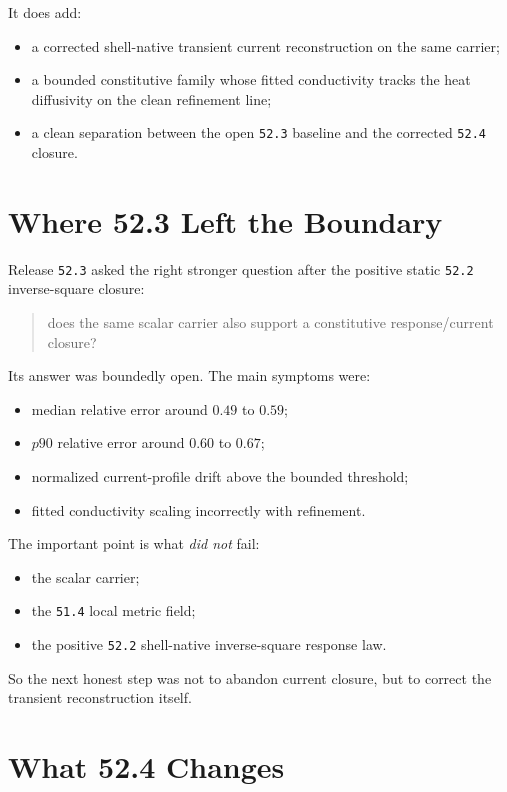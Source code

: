 \documentclass[11pt]{article}
\begin{document}
It does add:
\begin{itemize}
\item a corrected shell-native transient current reconstruction on the same carrier;
\item a bounded constitutive family whose fitted conductivity tracks the heat diffusivity on the clean refinement line;
\item a clean separation between the open \texttt{52.3} baseline and the corrected \texttt{52.4} closure.
\end{itemize}

\section{Where 52.3 Left the Boundary}

Release \texttt{52.3} asked the right stronger question after the positive static \texttt{52.2} inverse-square closure:

\begin{quote}
does the same scalar carrier also support a constitutive response/current closure?
\end{quote}

Its answer was boundedly open. The main symptoms were:
\begin{itemize}
\item median relative error around \(0.49\) to \(0.59\);
\item \(p90\) relative error around \(0.60\) to \(0.67\);
\item normalized current-profile drift above the bounded threshold;
\item fitted conductivity scaling incorrectly with refinement.
\end{itemize}

The important point is what \emph{did not} fail:
\begin{itemize}
\item the scalar carrier;
\item the \texttt{51.4} local metric field;
\item the positive \texttt{52.2} shell-native inverse-square response law.
\end{itemize}

So the next honest step was not to abandon current closure, but to correct the transient reconstruction itself.

\section{What 52.4 Changes}
\end{document}
